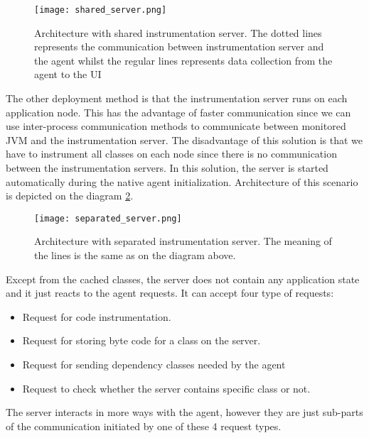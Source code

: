  \begin{figure}
 	\centering
 	\texttt{[image: shared\_server.png]}
 	\caption{Architecture with shared instrumentation server. The dotted lines represents the communication between instrumentation server and the agent whilst the regular lines represents data collection from the agent to the UI}
 	\label{fig:shared_server}
 \end{figure}
 
 The other deployment method is that the instrumentation server runs on each application node. This has the advantage of faster communication since we can use inter-process communication methods to communicate between monitored JVM and the instrumentation server. The disadvantage of this solution is that we have to instrument all classes on each node since there is no communication between the instrumentation servers. In this solution, the server is started automatically during the native agent initialization. Architecture of this scenario is depicted on the diagram \ref{fig:separated_server}.
 
 \begin{figure}
 	\centering
 	\texttt{[image: separated\_server.png]}
 	\caption{Architecture with separated instrumentation server. The meaning of the lines is the same as on the diagram above.}
 	\label{fig:separated_server}
 \end{figure}


Except from the cached classes, the server does not contain any application state and it just reacts to the agent requests. It can accept four type of requests:
\begin{itemize}
	\item Request for code instrumentation.
	\item Request for storing byte code for a class on the server.
	\item Request for sending dependency classes needed by the agent
	\item Request to check whether the server contains specific class or not.
\end{itemize}
The server interacts in more ways with the agent, however they are just sub-parts of the communication initiated by one of these 4 request types.	

